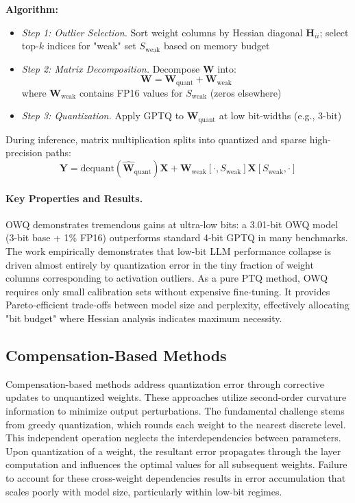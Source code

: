 \textbf{Algorithm:}
\begin{itemize}
\item \textit{Step 1: Outlier Selection.} Sort weight columns by Hessian diagonal $\bm{H}_{ii}$; select top-$k$ indices for "weak" set $S_{\text{weak}}$ based on memory budget
\item \textit{Step 2: Matrix Decomposition.} Decompose $\bm{W}$ into:
  \begin{equation}
    \bm{W} = \bm{W}_{\text{quant}} + \bm{W}_{\text{weak}}
  \end{equation}
  where $\bm{W}_{\text{weak}}$ contains FP16 values for $S_{\text{weak}}$ (zeros elsewhere)
\item \textit{Step 3: Quantization.} Apply GPTQ to $\bm{W}_{\text{quant}}$ at low bit-widths (e.g., 3-bit)
\end{itemize}

During inference, matrix multiplication splits into quantized and sparse high-precision paths:
\begin{equation}
\bm{Y} = \text{dequant}(\hat{\bm{W}}_{\text{quant}}) \bm{X} + \bm{W}_{\text{weak}}[\cdot, S_{\text{weak}}] \bm{X}[S_{\text{weak}}, \cdot]
\end{equation}

\paragraph{Key Properties and Results.}
OWQ demonstrates tremendous gains at ultra-low bits: a 3.01-bit OWQ model (3-bit base + 1\% FP16) outperforms standard 4-bit GPTQ in many benchmarks. The work empirically demonstrates that low-bit LLM performance collapse is driven almost entirely by quantization error in the tiny fraction of weight columns corresponding to activation outliers. As a pure PTQ method, OWQ requires only small calibration sets without expensive fine-tuning. It provides Pareto-efficient trade-offs between model size and perplexity, effectively allocating "bit budget" where Hessian analysis indicates maximum necessity.

\subsection{Compensation-Based Methods}

Compensation-based methods address quantization error through corrective updates to unquantized weights. These approaches utilize second-order curvature information to minimize output perturbations. The fundamental challenge stems from greedy quantization, which rounds each weight to the nearest discrete level. This independent operation neglects the interdependencies between parameters. Upon quantization of a weight, the resultant error propagates through the layer computation and influences the optimal values for all subsequent weights. Failure to account for these cross-weight dependencies results in error accumulation that scales poorly with model size, particularly within low-bit regimes.

